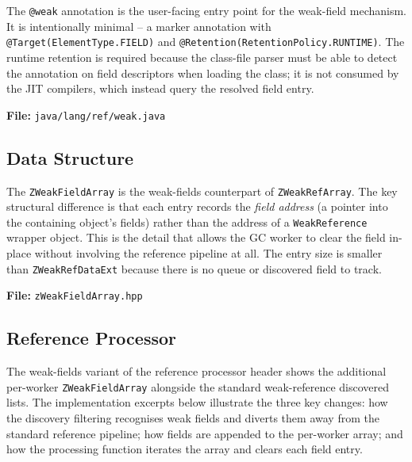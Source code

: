 The \texttt{@weak} annotation is the user-facing entry point for the weak-field mechanism. It is intentionally minimal -- a marker annotation with \texttt{@Target(ElementType.FIELD)} and \texttt{@Retention(RetentionPolicy.RUNTIME)}. The runtime retention is required because the class-file parser must be able to detect the annotation on field descriptors when loading the class; it is not consumed by the JIT compilers, which instead query the resolved field entry.

\noindent\textbf{File:} \texttt{java/lang/ref/weak.java}



\subsection{Data Structure}
\label{app:source-wf-array}

The \texttt{ZWeakFieldArray} is the weak-fields counterpart of \texttt{ZWeakRefArray}. The key structural difference is that each entry records the \emph{field address} (a pointer into the containing object's fields) rather than the address of a \texttt{WeakReference} wrapper object. This is the detail that allows the \ac{GC} worker to clear the field in-place without involving the reference pipeline at all. The entry size is smaller than \texttt{ZWeakRefDataExt} because there is no queue or discovered field to track.

\noindent\textbf{File:} \texttt{zWeakFieldArray.hpp}



\subsection{Reference Processor}
\label{app:source-wf-refproc}

The weak-fields variant of the reference processor header shows the additional per-worker \texttt{ZWeakFieldArray} alongside the standard weak-reference discovered lists. The implementation excerpts below illustrate the three key changes: how the discovery filtering recognises weak fields and diverts them away from the standard reference pipeline; how fields are appended to the per-worker array; and how the processing function iterates the array and clears each field entry.

